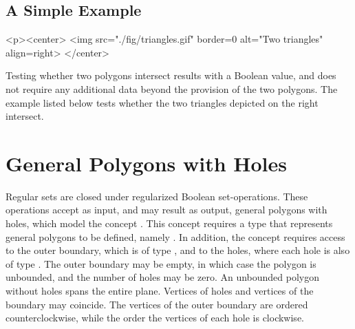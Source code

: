 \subsection{A Simple Example}
\label{bso_ssec:simple_example}
\lcTex{%
  \vspace{-20pt}
  \setlength{\widthRight}{1.4cm}
  \setlength{\widthLeft}{\widthLineReal}
  \addtolength{\widthLeft}{-\widthRight}
  \begin{minipage}{\widthLeft}
}
\label{fig:example}
\begin{ccHtmlOnly}
  <p><center>
    <img src="./fig/triangles.gif" border=0 alt="Two triangles" align=right>
  </center>
\end{ccHtmlOnly}
Testing whether two polygons intersect results with a Boolean value, 
and does not require any additional data beyond the provision of the 
two polygons. The example listed below tests whether the two triangles 
depicted on the right intersect.

\lcTex{\vspace{-20pt}}

\section{General Polygons with Holes}
\label{bso_sec:general_polygons_with_holes}
Regular sets are closed under regularized Boolean set-operations.
These operations accept as input, and may result as output, general
polygons with holes, which model the concept 
. This concept requires a type that
represents general polygons to be defined, namely .
In addition, the concept requires access to the outer boundary, which is 
of type , and to the holes, where each hole is also 
of type . The outer boundary may be empty, in
which case the polygon is unbounded, and the number of holes may be zero. 
An unbounded polygon without holes spans the entire plane. Vertices of holes
and vertices of the boundary may coincide. The vertices of the outer
boundary are ordered counterclockwise, while the order the vertices
of each hole is clockwise.


